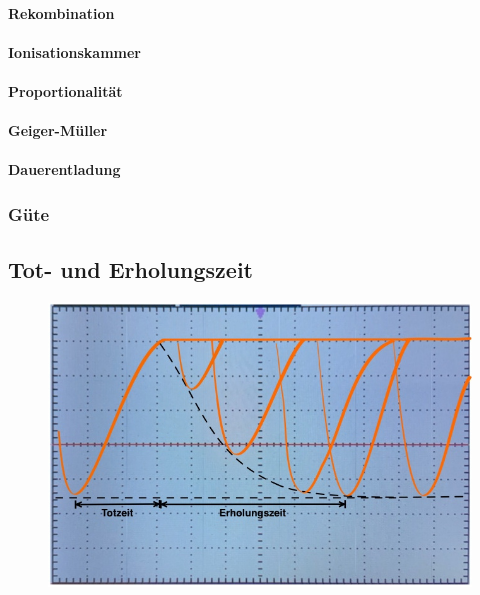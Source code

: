 \paragraph{Rekombination}

\paragraph{Ionisationskammer}

\paragraph{Proportionalität}

\paragraph{Geiger-Müller}

\paragraph{Dauerentladung}

\subsubsection{Güte}

\subsection{Tot- und Erholungszeit}

\begin{figure}[H]
	\centering
	\includegraphics[width=0.5\linewidth]{content/grafik/zeit.jpg}
	\caption{}
	\label{fig:zeit}
\end{figure}

